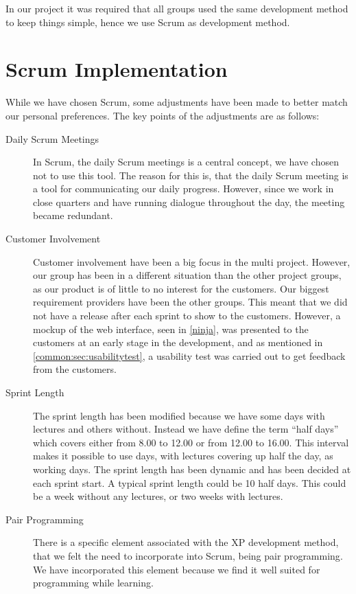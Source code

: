 In our project it was required that all groups used the same development method to keep things simple, hence we use Scrum as development method.

\section{Scrum Implementation}
While we have chosen Scrum, some adjustments have been made to better match our personal preferences. 
The key points of the adjustments are as follows:

\begin{description}
\item [Daily Scrum Meetings]
      In Scrum, the daily Scrum meetings is a central concept, we have chosen not to use this tool. The reason for this is, that the daily Scrum meeting is a tool for communicating our daily progress. However, since we work in close quarters and have running dialogue throughout the day, the meeting became redundant.

\item [Customer Involvement]
      Customer involvement have been a big focus in the multi project. However, our group has been in a different situation than the other project groups, as our product is of little to no interest for the customers. Our biggest requirement providers have been the other groups. This meant that we did not have a release after each sprint to show to the customers. However, a mockup of the web interface, seen in \autoref{ninja}, was presented to the customers at an early stage in the development, and as mentioned in \autoref{common:sec:usabilitytest}, a usability test was carried out to get feedback from the customers. 

\item [Sprint Length]
      The sprint length has been modified because we have some days with lectures and others without. Instead we have define the term ``half days'' which covers either from 8.00 to 12.00 or from 12.00 to 16.00. This interval makes it possible to use days, with lectures covering up half the day, as working days. The sprint length has been dynamic and has been decided at each sprint start. A typical sprint length could be 10 half days. This could be a week without any lectures, or two weeks with lectures. 

\item [Pair Programming]
      There is a specific element associated with the XP development method, that we felt the need to incorporate into Scrum, being pair programming\cite{larman}. We have incorporated this element because we find it well suited for programming while learning.

\end{description}







